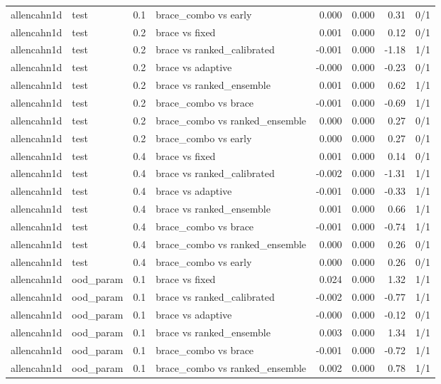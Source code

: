 \begin{tabular}{llllrrrr}
allencahn1d & test & 0.1 & brace\_combo vs early & 0.000 & 0.000 & 0.31 & 0/1 \\
allencahn1d & test & 0.2 & brace vs fixed & 0.001 & 0.000 & 0.12 & 0/1 \\
allencahn1d & test & 0.2 & brace vs ranked\_calibrated & -0.001 & 0.000 & -1.18 & 1/1 \\
allencahn1d & test & 0.2 & brace vs adaptive & -0.000 & 0.000 & -0.23 & 0/1 \\
allencahn1d & test & 0.2 & brace vs ranked\_ensemble & 0.001 & 0.000 & 0.62 & 1/1 \\
allencahn1d & test & 0.2 & brace\_combo vs brace & -0.001 & 0.000 & -0.69 & 1/1 \\
allencahn1d & test & 0.2 & brace\_combo vs ranked\_ensemble & 0.000 & 0.000 & 0.27 & 0/1 \\
allencahn1d & test & 0.2 & brace\_combo vs early & 0.000 & 0.000 & 0.27 & 0/1 \\
allencahn1d & test & 0.4 & brace vs fixed & 0.001 & 0.000 & 0.14 & 0/1 \\
allencahn1d & test & 0.4 & brace vs ranked\_calibrated & -0.002 & 0.000 & -1.31 & 1/1 \\
allencahn1d & test & 0.4 & brace vs adaptive & -0.001 & 0.000 & -0.33 & 1/1 \\
allencahn1d & test & 0.4 & brace vs ranked\_ensemble & 0.001 & 0.000 & 0.66 & 1/1 \\
allencahn1d & test & 0.4 & brace\_combo vs brace & -0.001 & 0.000 & -0.74 & 1/1 \\
allencahn1d & test & 0.4 & brace\_combo vs ranked\_ensemble & 0.000 & 0.000 & 0.26 & 0/1 \\
allencahn1d & test & 0.4 & brace\_combo vs early & 0.000 & 0.000 & 0.26 & 0/1 \\
allencahn1d & ood\_param & 0.1 & brace vs fixed & 0.024 & 0.000 & 1.32 & 1/1 \\
allencahn1d & ood\_param & 0.1 & brace vs ranked\_calibrated & -0.002 & 0.000 & -0.77 & 1/1 \\
allencahn1d & ood\_param & 0.1 & brace vs adaptive & -0.000 & 0.000 & -0.12 & 0/1 \\
allencahn1d & ood\_param & 0.1 & brace vs ranked\_ensemble & 0.003 & 0.000 & 1.34 & 1/1 \\
allencahn1d & ood\_param & 0.1 & brace\_combo vs brace & -0.001 & 0.000 & -0.72 & 1/1 \\
allencahn1d & ood\_param & 0.1 & brace\_combo vs ranked\_ensemble & 0.002 & 0.000 & 0.78 & 1/1 \\

\end{tabular}
